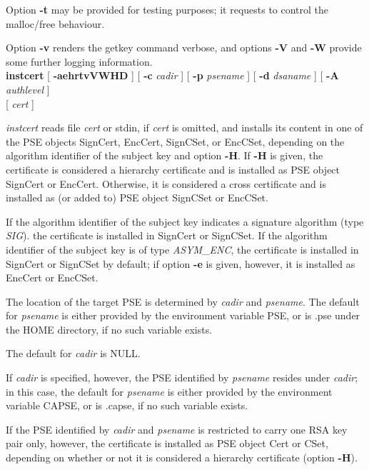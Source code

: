 Option {\bf -t} may be provided for testing purposes; it requests to control the malloc/free behaviour.

Option {\bf -v} renders the getkey command verbose, and options {\bf -V} and {\bf -W} provide 
some further logging
information.
\\ [1em] 
{\bf instcert} [ {\bf -aehrtvVWHD} ] [ {\bf -c} {\em cadir} ] [ {\bf -p} {\em psename} ] [ {\bf -d} {\em dsaname} ] [ {\bf -A} {\em authlevel} ] \\
\hspace*{2cm} [ {\em cert} ]

{\em instcert} reads file {\em cert} or stdin, if {\em cert} is omitted, 
and installs its content in one of the PSE objects SignCert, EncCert, SignCSet, or EncCSet, depending on
the algorithm identifier of the subject key and option {\bf -H}. If {\bf -H} is given, the
certificate is considered a hierarchy certificate and is installed as PSE object SignCert or
EncCert. Otherwise, it is considered a cross certificate and is installed as (or added to) PSE object SignCSet or EncCSet.

If the algorithm identifier of the subject key indicates a signature algorithm (type {\em SIG}).
the certificate is installed in SignCert or SignCSet.
If the algorithm identifier of the subject key is of type {\em ASYM\_ENC}, the certificate
is installed in SignCert or SignCSet by default; if option {\bf -e} is given, however, it is
installed as EncCert or EncCSet.

The location of the target PSE is determined by {\em cadir} and {\em psename}. The default for {\em 
psename} is either provided by the environment variable PSE, or is .pse under the HOME directory, if no such
variable exists.
 
The default for {\em cadir} is NULL. 

If {\em cadir} is specified,
however, the PSE identified by {\em psename} resides under {\em cadir}; in this case, the default
for {\em psename} is either provided by the environment variable CAPSE, or is .capse, if no such variable
exists.

If the PSE identified by {\em cadir} and {\em psename} is restricted to carry one RSA key pair only, 
however, the certificate is installed as PSE object Cert or CSet, depending on whether or not it is considered a hierarchy certificate (option {\bf -H}).

